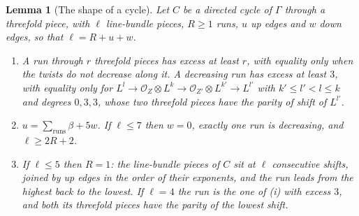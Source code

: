 \documentclass[11pt,reqno]{amsart}
\numberwithin{equation}{section}
\theoremstyle{plain}
\newtheorem{lemma}[theorem]{Lemma}
\theoremstyle{definition}
\begin{document}
\begin{lemma}[The shape of a cycle]\label{lem:cycleshape}
Let $C$ be a directed cycle of $\Gamma$ through a threefold piece, with $\ell$ line-bundle pieces, $R\ge1$ runs, $u$ up edges and $w$ down edges, so that $\ell=R+u+w$.
\begin{enumerate}[label=\textup{(\roman*)},leftmargin=2.4em,itemsep=2pt]
\item A run through $r$ threefold pieces has excess at least $r$, with equality only when the twists do not decrease along it. A decreasing run has excess at least $3$, with equality only for $L^{l}\to\mathcal{O}_{Z}\otimes L^{k}\to\mathcal{O}_{Z'}\otimes L^{k'}\to L^{l'}$ with $k'\le l'<l\le k$ and degrees $0,3,3$, whose two threefold pieces have the parity of shift of $L^{l'}$.
\item $u=\sum_{\mathrm{runs}}\beta+5w$. If $\ell\le7$ then $w=0$, exactly one run is decreasing, and $\ell\ge2R+2$.
\item If $\ell\le5$ then $R=1$: the line-bundle pieces of $C$ sit at $\ell$ consecutive shifts, joined by up edges in the order of their exponents, and the run leads from the highest back to the lowest. If $\ell=4$ the run is the one of (i) with excess $3$, and both its threefold pieces have the parity of the lowest shift.
\end{enumerate}
\end{lemma}
\end{document}
